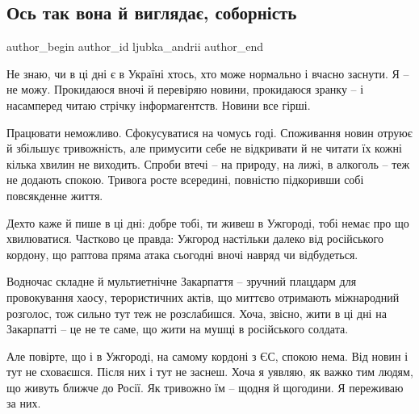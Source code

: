  
 
 
 
 
 
\subsection{Ось так вона й виглядає, соборність}
\label{sec:22_02_2022.stz.news.ua.zbruc.1.sobornist}
 
\ifcmt
 author_begin
   author_id ljubka_andrii
 author_end
\fi

Не знаю, чи в ці дні є в Україні хтось, хто може нормально і вчасно заснути. Я
– не можу. Прокидаюся вночі й перевіряю новини, прокидаюся зранку – і
насамперед читаю стрічку інформагентств. Новини все гірші.


Працювати неможливо. Сфокусуватися на чомусь годі. Споживання новин отруює й
збільшує тривожність, але примусити себе не відкривати й не читати їх кожні
кілька хвилин не виходить. Спроби втечі – на природу, на лижі, в алкоголь – теж
не додають спокою. Тривога росте всередині, повністю підкоривши собі
повсякденне життя.


Дехто каже й пише в ці дні: добре тобі, ти живеш в Ужгороді, тобі немає про що
хвилюватися. Частково це правда: Ужгород настільки далеко від російського
кордону, що раптова пряма атака сьогодні вночі навряд чи відбудеться.

Водночас складне й мультиетнічне Закарпаття – зручний плацдарм для провокування
хаосу, терористичних актів, що миттєво отримають міжнародний розголос, тож
сильно тут теж не розслабишся. Хоча, звісно, жити в ці дні на Закарпатті – це
не те саме, що жити на мушці в російського солдата.

Але повірте, що і в Ужгороді, на самому кордоні з ЄС, спокою нема. Від новин і
тут не сховаєшся. Після них і тут не заснеш. Хоча я уявляю, як важко тим людям,
що живуть ближче до Росії. Як тривожно їм – щодня й щогодини. Я переживаю за
них.

